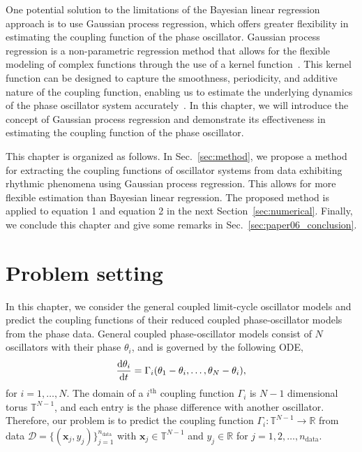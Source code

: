 One potential solution to the limitations of the Bayesian linear regression approach is to use Gaussian process regression, which offers greater flexibility in estimating the coupling function of the phase oscillator. Gaussian process regression is a non-parametric regression method that allows for the flexible modeling of complex functions through the use of a kernel function~\cite{rasumussen2006}. This kernel function can be designed to capture the smoothness, periodicity, and additive nature of the coupling function, enabling us to estimate the underlying dynamics of the phase oscillator system accurately~\cite{kanagawa2018}. In this chapter, we will introduce the concept of Gaussian process regression and demonstrate its effectiveness in estimating the coupling function of the phase oscillator.


This chapter is organized as follows.
In Sec.~\ref{sec:method}, we propose a method for extracting the coupling functions of oscillator systems from data exhibiting rhythmic phenomena using Gaussian process regression. This allows for more flexible estimation than Bayesian linear regression.
The proposed method is applied to equation 1 and equation 2 in the next Section~\ref{sec:numerical}.
Finally, we conclude this chapter and give some remarks in Sec.~\ref{sec:paper06_conclusion}.


\section{Problem setting}

In this chapter, we consider the general coupled limit-cycle oscillator models and predict the coupling functions of their reduced coupled phase-oscillator models from the phase data.
General coupled phase-oscillator models consist of $N$ oscillators with their phase $\theta_{i}$, and is governed by the following ODE,
\begin{align}
    \frac{\mathrm{d} \theta_{i}}{\mathrm{d} t}=\Gamma_{i}(\theta_{1}-\theta_{i},\ldots,\theta_{N}-\theta_{i}),
\end{align}
for $i=1,\ldots,N$.
The domain of a $i^{\mathrm{th}}$ coupling function $\Gamma_{i}$ is $N-1$ dimensional torus $\mathbb{T}^{N-1}$,
and each entry is the phase difference with another oscillator.
Therefore, our problem is to predict the coupling function $\Gamma_{i}\colon\mathbb{T}^{N-1}\to\mathbb{R}$ from data $\mathcal{D}=\{(\bm{x}_{j},y_{j})\}_{j=1}^{n_{\mathrm{data}}}$ with $\bm{x}_{j}\in\mathbb{T}^{N-1}$ and $y_{j}\in\mathbb{R}$ for $j=1,2,\ldots,n_{\mathrm{data}}$.

